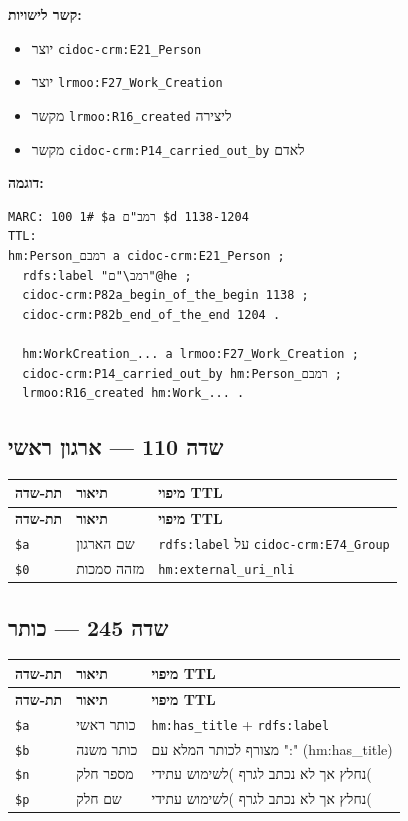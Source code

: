 \documentclass[12pt,a4paper]{article}
\newcommand{\marcfield}[1]{\texttt{#1}}
\newcommand{\ttlprop}[1]{\texttt{#1}}
\newcommand{\ttlclass}[1]{\texttt{#1}}
\begin{document}
\textbf{קשר לישויות:}
\begin{itemize}
\item יוצר \ttlclass{cidoc-crm:E21\_Person}
\item יוצר \ttlclass{lrmoo:F27\_Work\_Creation}
\item מקשר \ttlprop{lrmoo:R16\_created} ליצירה
\item מקשר \ttlprop{cidoc-crm:P14\_carried\_out\_by} לאדם
\end{itemize}

\textbf{דוגמה:}
\begin{LTR}
\begin{verbatim}
MARC: 100 1# $a רמב"ם $d 1138-1204
TTL:
hm:Person_רמבם a cidoc-crm:E21_Person ;
  rdfs:label "רמב\"ם"@he ;
  cidoc-crm:P82a_begin_of_the_begin 1138 ;
  cidoc-crm:P82b_end_of_the_end 1204 .
  
  hm:WorkCreation_... a lrmoo:F27_Work_Creation ;
  cidoc-crm:P14_carried_out_by hm:Person_רמבם ;
  lrmoo:R16_created hm:Work_... .
\end{verbatim}
\end{LTR}

\subsection{שדה 110 — ארגון ראשי}

\begin{longtable}{|L{2.5cm}|p{4.5cm}|L{9cm}|}
\hline
\textbf{תת-שדה} & \textbf{תיאור} & \textbf{מיפוי TTL} \\
\hline
\endfirsthead
\hline
\textbf{תת-שדה} & \textbf{תיאור} & \textbf{מיפוי TTL} \\
\hline
\endhead
\hline
\endfoot
\marcfield{\$a} & שם הארגון & \ttlprop{rdfs:label} על \ttlclass{cidoc-crm:E74\_Group} \\
\hline
\marcfield{\$0} & מזהה סמכות & \ttlprop{hm:external\_uri\_nli} \\
\hline
\end{longtable}

\subsection{שדה 245 — כותר}

\begin{longtable}{|L{2.5cm}|p{4.5cm}|L{9cm}|}
\hline
\textbf{תת-שדה} & \textbf{תיאור} & \textbf{מיפוי TTL} \\
\hline
\endfirsthead
\hline
\textbf{תת-שדה} & \textbf{תיאור} & \textbf{מיפוי TTL} \\
\hline
\endhead
\hline
\endfoot
\marcfield{\$a} & כותר ראשי & \ttlprop{hm:has\_title} + \ttlprop{rdfs:label} \\
\hline
\marcfield{\$b} & כותר משנה & מצורף לכותר המלא עם ":" \textenglish{(hm:has\_title)} \\
\hline
\marcfield{\$n} & מספר חלק & נחלץ אך לא נכתב לגרף )לשימוש עתידי( \\
\hline
\marcfield{\$p} & שם חלק & נחלץ אך לא נכתב לגרף )לשימוש עתידי( \\
\hline
\end{longtable}
\end{document}
